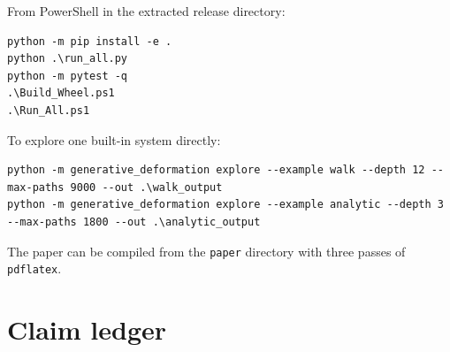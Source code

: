 \documentclass[11pt,openany]{report}
\theoremstyle{definition}
\theoremstyle{remark}
\begin{document}
From PowerShell in the extracted release directory:

\begin{lstlisting}
python -m pip install -e .
python .\run_all.py
python -m pytest -q
.\Build_Wheel.ps1
.\Run_All.ps1
\end{lstlisting}

To explore one built-in system directly:

\begin{lstlisting}
python -m generative_deformation explore --example walk --depth 12 --max-paths 9000 --out .\walk_output
python -m generative_deformation explore --example analytic --depth 3 --max-paths 1800 --out .\analytic_output
\end{lstlisting}

The paper can be compiled from the \texttt{paper} directory with three passes of \texttt{pdflatex}.

\chapter{Claim ledger}
\end{document}
